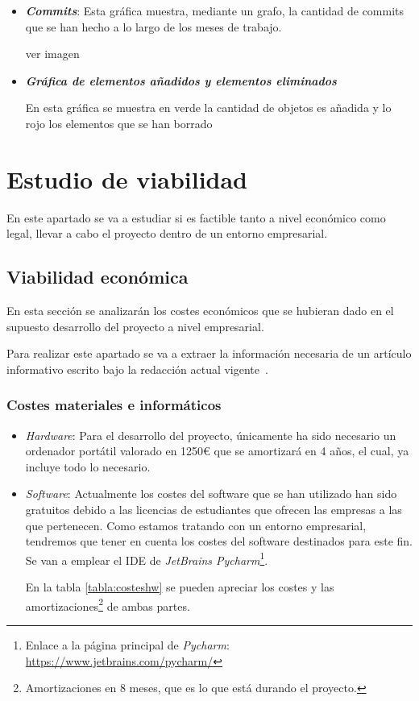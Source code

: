 \begin{itemize}
	\item \textit{\textbf{Commits}}: Esta gráfica muestra, mediante un grafo, la cantidad de commits que se han hecho a lo largo de los meses de trabajo. 
	
	ver imagen \label{fig: grafo} 
	
	
	\item \textit{\textbf{Gráfica de elementos añadidos y elementos eliminados}}
	
	En esta gráfica se muestra en verde la cantidad de objetos es añadida y lo rojo los elementos que se han borrado
	


	
\end{itemize}
\section{Estudio de viabilidad}
En este apartado se va a estudiar si es factible tanto a nivel económico como legal, llevar a cabo el proyecto dentro de un entorno empresarial.

\subsection{Viabilidad económica}
En esta sección se analizarán los costes económicos que se hubieran dado en el supuesto desarrollo del proyecto a nivel empresarial.

Para realizar este apartado se va a extraer la información necesaria de un artículo informativo escrito bajo la redacción actual vigente~\cite{cotizacion}.

 
\subsubsection{Costes materiales e informáticos}

\begin{itemize}
	\item \textit{Hardware}: Para el desarrollo del proyecto, únicamente ha sido necesario un ordenador portátil valorado en 1250\euro{} que se amortizará en 4 años, el cual, ya incluye todo lo necesario. 
	
	\item \textit{Software}: Actualmente los costes del software que se han utilizado han sido gratuitos debido a las licencias de estudiantes que ofrecen las empresas a las que pertenecen. Como estamos tratando con un entorno empresarial, tendremos que tener en cuenta los costes del software destinados para este fin.
	Se van a emplear el IDE de \textit{JetBrains Pycharm}\footnote{Enlace a la página principal de \textit{Pycharm}: \url{https://www.jetbrains.com/pycharm/}}.
	
	En la tabla \ref{tabla:costeshw} se pueden apreciar los costes y las amortizaciones\footnote{Amortizaciones en 8 meses, que es lo que está durando el proyecto.} de ambas partes. 
\end{itemize}

